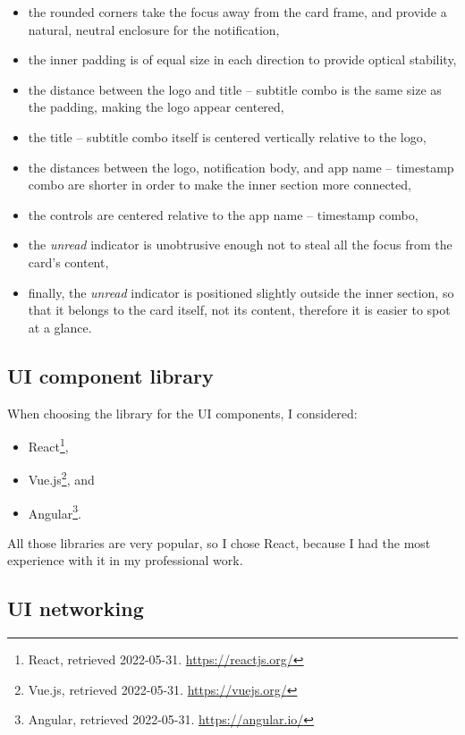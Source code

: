 \begin{itemize}
\tightlist
\item
  the rounded corners take the focus away from the card frame, and
  provide a natural, neutral enclosure for the notification,
\item
  the inner padding is of equal size in each direction to provide
  optical stability,
\item
  the distance between the logo and title -- subtitle combo is the same
  size as the padding, making the logo appear centered,
\item
  the title -- subtitle combo itself is centered vertically relative to
  the logo,
\item
  the distances between the logo, notification body, and app name --
  timestamp combo are shorter in order to make the inner section more
  connected,
\item
  the controls are centered relative to the app name -- timestamp combo,
\item
  the \emph{unread} indicator is unobtrusive enough not to steal all the
  focus from the card's content,
\item
  finally, the \emph{unread} indicator is positioned slightly outside
  the inner section, so that it belongs to the card itself, not its
  content, therefore it is easier to spot at a glance.
\end{itemize}

\hypertarget{ui-component-library}{%
\subsection{UI component library}\label{ui-component-library}}

When choosing the library for the UI components, I considered:

\begin{itemize}
\tightlist
\item
  React\footnote{React, retrieved 2022-05-31. \url{https://reactjs.org/}},
\item
  Vue.js\footnote{Vue.js, retrieved 2022-05-31. \url{https://vuejs.org/}},
  and
\item
  Angular\footnote{Angular, retrieved 2022-05-31.
    \url{https://angular.io/}}.
\end{itemize}

All those libraries are very popular, so I chose React, because I had
the most experience with it in my professional work.

\hypertarget{ui-networking}{%
\subsection{UI networking}\label{ui-networking}}

